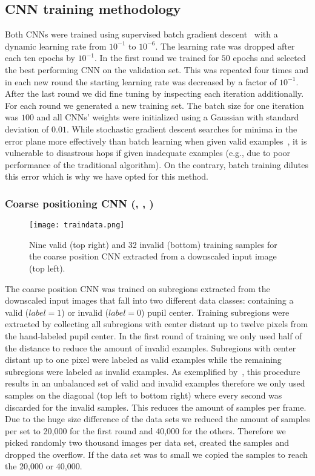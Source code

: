 \subsection{CNN training methodology}
\label{subsec:training}
Both CNNs were trained using supervised batch gradient
descent~\citet{lecun2012efficient} with a dynamic learning rate from $10^{-1}$ to $10^{-6}$. The learning rate was dropped after each ten epochs by $10^{-1}$. In the first round we trained for $50$ epochs and selected the best performing CNN on the validation set. This was repeated four times and in each new round the starting learning rate was decreased by a factor of $10^{-1}$. After the last round we did fine tuning by inspecting each iteration additionally. For each round we generated a new training set. The batch size for one iteration was $100$ and all CNNs' weights were initialized using a Gaussian with standard deviation of $0.01$.
While stochastic gradient descent searches for minima in the error plane more
effectively than batch learning when given valid
examples~\citet{heskes1993line,orr1995dynamics}, it is vulnerable to disastrous
hops if given inadequate examples (e.g., due to poor performance of the
traditional algorithm). On the contrary, batch training dilutes this error which is why we have opted for this method.

\subsubsection{Coarse positioning CNN (, , )}
\begin{figure}[h]
	\begin{center}
		\texttt{[image: traindata.png]}
	\end{center}
	\caption{
		Nine valid (top right) and 32 invalid (bottom) training samples for the coarse
		position CNN extracted from a downscaled input image (top left).
	}
	\label{fig:traindata}
\end{figure}
The coarse position CNN was trained on subregions extracted from the downscaled
input images that fall into two different data classes: containing a valid
($label=1$) or invalid ($label=0$) pupil center.  Training subregions were
extracted by collecting all subregions with center distant up to twelve pixels
from the hand-labeled pupil center. In the first round of training we only used
half of the distance to reduce the amount of invalid examples.  Subregions with
center distant up to one pixel were labeled as valid examples while the
remaining subregions were labeled as invalid examples. As exemplified
by~, this procedure results in an unbalanced set of valid
and invalid examples therefore we only used samples on the diagonal (top left to
bottom right) where every second was discarded for the invalid samples. This
reduces the amount of samples per frame. Due to the huge size difference of the
data sets we reduced the amount of samples per set to 20,000 for the first round
and 40,000 for the others. Therefore we picked randomly two thousand images per
data set, created the samples and dropped the overflow. If the data set was to
small we copied the samples to reach the 20,000 or 40,000.


